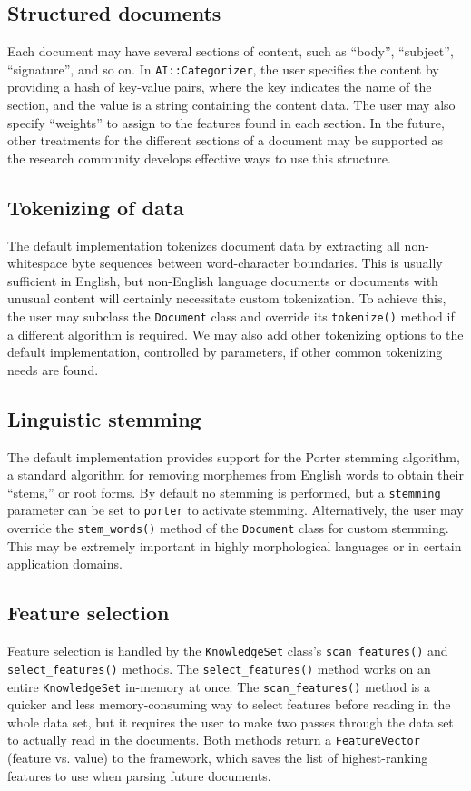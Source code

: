 \documentclass[a4paper,twocolumn]{article}
\begin{document}
\subsection{Structured documents}
Each document may have several sections of content, such as ``body'',
``subject'', ``signature'', and so on.  In \texttt{AI::Categorizer},
the user specifies the content by providing a hash of key-value pairs,
where the key indicates the name of the section, and the value is a
string containing the content data.  The user may also specify
``weights'' to assign to the features found in each section.  In the
future, other treatments for the different sections of a document may
be supported as the research community develops effective ways to use
this structure.


\subsection{Tokenizing of data}
The default implementation tokenizes document data by extracting 
all non-whitespace byte sequences between word-character 
boundaries.  This is usually sufficient in English,
but non-English language documents or documents with unusual content
will certainly necessitate custom tokenization.  To achieve this, the
user may subclass the \texttt{Document} class and override its
\texttt{tokenize()} method if a different algorithm is required.  We
may also add other tokenizing options to the default implementation,
controlled by parameters, if other common tokenizing needs are found.

\subsection{Linguistic stemming}
The default implementation provides support for the Porter stemming
algorithm, a standard algorithm for removing morphemes from English
words to obtain their ``stems,'' or root forms.  By default no
stemming is performed, but a \texttt{stemming} parameter can be set to
\texttt{porter} to activate stemming.  Alternatively, the user may
override the \texttt{stem\_words()} method of the \texttt{Document}
class for custom stemming.  This may be extremely important in highly
morphological languages or in certain application domains.

\subsection{Feature selection}
Feature selection is handled by the \texttt{KnowledgeSet} class's
\texttt{scan\_features()} and \texttt{select\_features()} methods.
The \texttt{select\_features()} method works on an entire
\texttt{KnowledgeSet} in-memory at once.  The
\texttt{scan\_features()} method is a quicker and less
memory-consuming way to select features before reading in the whole
data set, but it requires the user to make two passes through the data
set to actually read in the documents.  Both methods return a
\texttt{FeatureVector} (feature vs. value) to the framework, which
saves the list of highest-ranking features to use when parsing future
documents.
\end{document}
